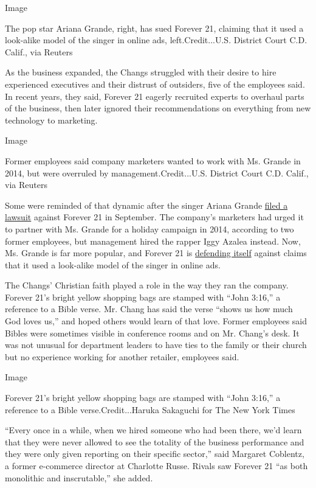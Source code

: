 Image

The pop star Ariana Grande, right, has sued Forever 21, claiming that it
used a look-alike model of the singer in online ads, left.Credit...U.S.
District Court C.D. Calif., via Reuters

As the business expanded, the Changs struggled with their desire to hire
experienced executives and their distrust of outsiders, five of the
employees said. In recent years, they said, Forever 21 eagerly recruited
experts to overhaul parts of the business, then later ignored their
recommendations on everything from new technology to marketing.

Image

Former employees said company marketers wanted to work with Ms. Grande
in 2014, but were overruled by management.Credit...U.S. District Court
C.D. Calif., via Reuters

Some were reminded of that dynamic after the singer Ariana Grande
\href{https://www.nytimes3xbfgragh.onion/2019/09/03/arts/music/ariana-grande-forever-21.html}{filed
a lawsuit} against Forever 21 in September. The company's marketers had
urged it to partner with Ms. Grande for a holiday campaign in 2014,
according to two former employees, but management hired the rapper Iggy
Azalea instead. Now, Ms. Grande is far more popular, and Forever 21 is
\href{https://www.nytimes3xbfgragh.onion/2019/09/03/arts/music/ariana-grande-forever-21.html}{defending
itself} against claims that it used a look-alike model of the singer in
online ads.

The Changs' Christian faith played a role in the way they ran the
company. Forever 21's bright yellow shopping bags are stamped with
``John 3:16,'' a reference to a Bible verse. Mr. Chang has said the
verse ``shows us how much God loves us,'' and hoped others would learn
of that love. Former employees said Bibles were sometimes visible in
conference rooms and on Mr. Chang's desk. It was not unusual for
department leaders to have ties to the family or their church but no
experience working for another retailer, employees said.

Image

Forever 21's bright yellow shopping bags are stamped with ``John 3:16,''
a reference to a Bible verse.Credit...Haruka Sakaguchi for The New York
Times

``Every once in a while, when we hired someone who had been there, we'd
learn that they were never allowed to see the totality of the business
performance and they were only given reporting on their specific
sector,'' said Margaret Coblentz, a former e-commerce director at
Charlotte Russe. Rivals saw Forever 21 ``as both monolithic and
inscrutable,'' she added.

